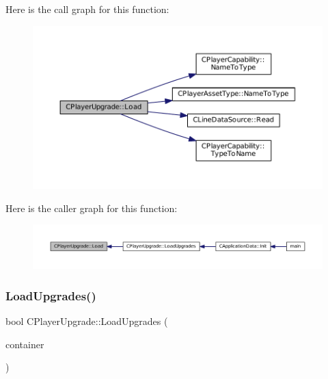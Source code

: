 Here is the call graph for this function\+:\nopagebreak
\begin{figure}[H]
\begin{center}
\leavevmode
\includegraphics[width=350pt]{classCPlayerUpgrade_a685fab69765ef63952cdbcaa6b1b927b_cgraph}
\end{center}
\end{figure}
Here is the caller graph for this function\+:\nopagebreak
\begin{figure}[H]
\begin{center}
\leavevmode
\includegraphics[width=350pt]{classCPlayerUpgrade_a685fab69765ef63952cdbcaa6b1b927b_icgraph}
\end{center}
\end{figure}
\hypertarget{classCPlayerUpgrade_a9bef3d3f2866cd555a9b175426e953d6}{}\label{classCPlayerUpgrade_a9bef3d3f2866cd555a9b175426e953d6} 
\subsubsection{\texorpdfstring{Load\+Upgrades()}{LoadUpgrades()}}
{\footnotesize\ttfamily bool C\+Player\+Upgrade\+::\+Load\+Upgrades (\begin{DoxyParamCaption}\item[{std\+::shared\+\_\+ptr$<$ \hyperlink{classCDataSourceContainer}{C\+Data\+Source\+Container} $>$}]{container }\end{DoxyParamCaption})\hspace{0.3cm}{\ttfamily [static]}}



